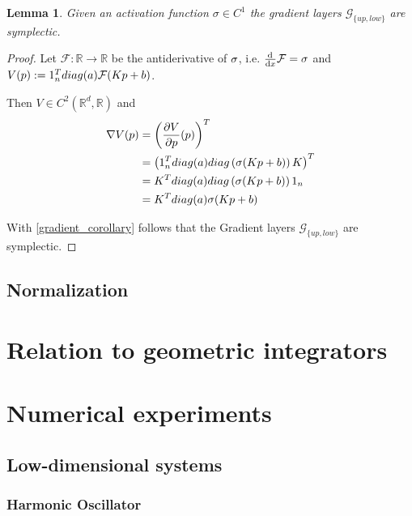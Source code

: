 \documentclass[twoside,a4paper]{article}
\begin{document}
\newtheorem*{glayer}{Lemma}
\begin{glayer}
	Given an activation function $\sigma \in C^1$ the gradient layers $\mathcal{G}_{\{up,low\}}$ 
	are symplectic.
\end{glayer}
\begin{proof}
	Let $\mathcal{F}: \mathbb{R} \to \mathbb{R}$ be the antiderivative of $\sigma$, 
	i.e. $\frac{\mathrm{d}^{}}{\mathrm{d}x} \mathcal{F} = \sigma$ and
	$V(p) := 1_{n}^Tdiag(a)\mathcal{F}(Kp+b)$.

	Then $V \in C^2(\mathbb{R}^d, \mathbb{R})$ and
	\begin{align*}
		\nabla V(p) &= \left(\frac{\partial V}{\partial p}(p)\right)^T \\
		&= \left(1_n^Tdiag(a)diag\left(\sigma(Kp+b)\right)K\right)^T \\
		&= K^Tdiag(a)diag\left(\sigma(Kp+b)\right)1_n \\
		&= K^Tdiag(a)\sigma(Kp+b)
	\end{align*}

	With \cref{gradient_corollary} follows that the Gradient layers $\mathcal{G}_{\{up,low\}}$
	are symplectic.
\end{proof}


\subsection{Normalization}




\section{Relation to geometric integrators}

\section{Numerical experiments}

\subsection{Low-dimensional systems}

\subsubsection{Harmonic Oscillator}
\end{document}
